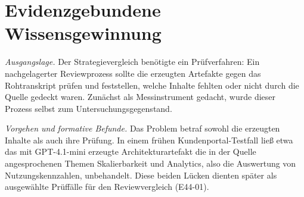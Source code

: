 %
%
%
%

\section{Evidenzgebundene Wissensgewinnung}
\label{sec:evidenzgebundene-wissensgewinnung}

\emph{Ausgangslage.} Der Strategievergleich benötigte ein
Prüfverfahren: Ein nachgelagerter Reviewprozess sollte die erzeugten
Artefakte gegen das Rohtranskript prüfen und feststellen, welche
Inhalte fehlten oder nicht durch die Quelle gedeckt waren. Zunächst
als Messinstrument gedacht, wurde dieser Prozess selbst zum
Untersuchungsgegenstand.

\emph{Vorgehen und formative Befunde.} Das Problem betraf sowohl
die erzeugten Inhalte als auch ihre Prüfung. In einem frühen
Kundenportal-Testfall ließ etwa das mit GPT-4.1-mini erzeugte
Architekturartefakt die in der Quelle angesprochenen Themen
Skalierbarkeit und Analytics, also die Auswertung von
Nutzungskennzahlen, unbehandelt. Diese beiden Lücken dienten später
als ausgewählte Prüffälle für den Reviewvergleich (E44-01).

